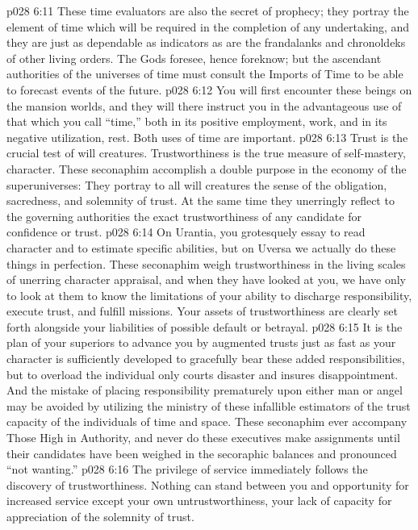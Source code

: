 \vs p028 6:11 These time evaluators are also the secret of prophecy; they portray the element of time which will be required in the completion of any undertaking, and they are just as dependable as indicators as are the frandalanks and chronoldeks of other living orders. The Gods foresee, hence foreknow; but the ascendant authorities of the universes of time must consult the Imports of Time to be able to forecast events of the future.
\vs p028 6:12 You will first encounter these beings on the mansion worlds, and they will there instruct you in the advantageous use of that which you call “time,” both in its positive employment, work, and in its negative utilization, rest. Both uses of time are important.
\pc \vs p028 6:13 \bibnobreakspace {} Trust is the crucial test of will creatures. Trustworthiness is the true measure of self\hyp{}mastery, character. These seconaphim accomplish a double purpose in the economy of the superuniverses: They portray to all will creatures the sense of the obligation, sacredness, and solemnity of trust. At the same time they unerringly reflect to the governing authorities the exact trustworthiness of any candidate for confidence or trust.
\vs p028 6:14 On Urantia, you grotesquely essay to read character and to estimate specific abilities, but on Uversa we actually do these things in perfection. These seconaphim weigh trustworthiness in the living scales of unerring character appraisal, and when they have looked at you, we have only to look at them to know the limitations of your ability to discharge responsibility, execute trust, and fulfill missions. Your assets of trustworthiness are clearly set forth alongside your liabilities of possible default or betrayal.
\pc \vs p028 6:15 It is the plan of your superiors to advance you by augmented trusts just as fast as your character is sufficiently developed to gracefully bear these added responsibilities, but to overload the individual only courts disaster and insures disappointment. And the mistake of placing responsibility prematurely upon either man or angel may be avoided by utilizing the ministry of these infallible estimators of the trust capacity of the individuals of time and space. These seconaphim ever accompany Those High in Authority, and never do these executives make assignments until their candidates have been weighed in the secoraphic balances and pronounced “not wanting.”
\pc \vs p028 6:16 \bibnobreakspace {} The privilege of service immediately follows the discovery of trustworthiness. Nothing can stand between you and opportunity for increased service except your own untrustworthiness, your lack of capacity for appreciation of the solemnity of trust.

